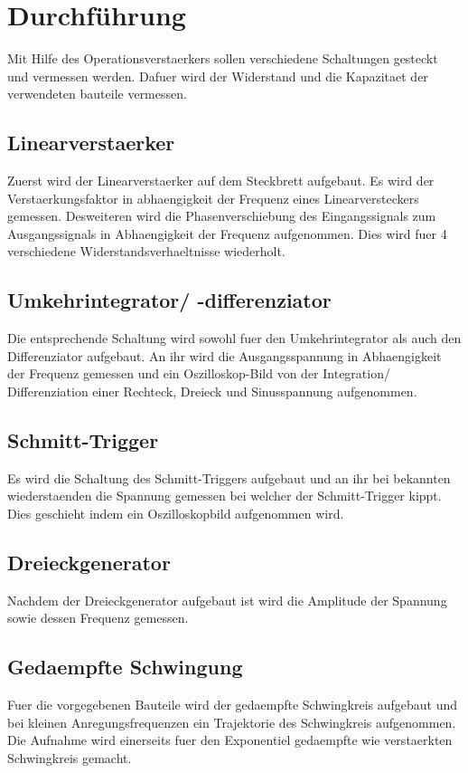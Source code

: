 \section{Durchführung}%
\label{sec:durchführung}
Mit Hilfe des Operationsverstaerkers sollen verschiedene Schaltungen gesteckt
und vermessen werden.
Dafuer wird der Widerstand und die Kapazitaet der verwendeten bauteile
vermessen.

\subsection{Linearverstaerker}%
\label{sub:linearverstaerker}
Zuerst wird der Linearverstaerker auf dem Steckbrett aufgebaut.
Es wird der Verstaerkungsfaktor in abhaengigkeit der Frequenz eines
Linearversteckers gemessen.
Desweiteren wird die Phasenverschiebung des Eingangssignals zum Ausgangssignals
in Abhaengigkeit der Frequenz aufgenommen.
Dies wird fuer 4 verschiedene Widerstandsverhaeltnisse wiederholt.

\subsection{Umkehrintegrator/ -differenziator}%
\label{sub:umkehrintegrator_differenziator}
Die entsprechende Schaltung wird sowohl fuer den Umkehrintegrator als auch den
Differenziator aufgebaut. 
An ihr wird die Ausgangsspannung in Abhaengigkeit der Frequenz gemessen und ein
Oszilloskop-Bild von der Integration/ Differenziation einer Rechteck, Dreieck
und Sinusspannung aufgenommen.

\subsection{Schmitt-Trigger}%
\label{sub:schmitt_trigger}
Es wird die Schaltung des Schmitt-Triggers aufgebaut und an ihr bei bekannten
wiederstaenden die Spannung gemessen bei welcher der Schmitt-Trigger kippt.
Dies geschieht indem ein Oszilloskopbild aufgenommen wird.

\subsection{Dreieckgenerator}%
\label{sub:dreieckgenerator}
Nachdem der Dreieckgenerator aufgebaut ist wird die Amplitude der
Spannung sowie dessen Frequenz gemessen.

\subsection{Gedaempfte Schwingung}%
\label{sub:gedaempfte_schwingung}
Fuer die vorgegebenen Bauteile wird der gedaempfte Schwingkreis aufgebaut und
bei kleinen Anregungsfrequenzen ein Trajektorie des Schwingkreis aufgenommen.
Die Aufnahme wird einerseits fuer den Exponentiel gedaempfte wie verstaerkten
Schwingkreis gemacht.
